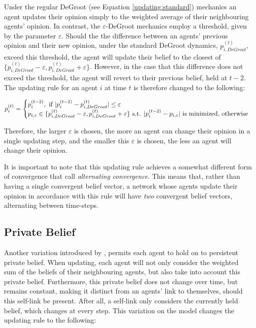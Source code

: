 \documentclass[a4paper, 12pt]{report}
\newcommand{\beli}[3][2]{p_{#2}^{(#3)}}
\begin{document}
\noindent Under the regular DeGroot (see Equation \ref{updating:standard}) mechanics an agent updates their opinion simply to the weighted average of their neighbouring agents' opinion. In contrast, the $\varepsilon$-DeGroot mechanics employ a threshold, given by the parameter $\varepsilon$. Should the the difference between an agents' previous opinion and their new opinion, under the standard DeGroot dynamics, $\beli{i, DeGroot}{t}$, exceed this threshold, the agent will update their belief to the closest of $\{\beli{i, DeGroot}{t} - \varepsilon, \beli{i, DeGroot}{t} + \varepsilon\}$. However, in the case that this difference does not exceed the threshold, the agent will revert to their previous belief, held at $t-2$. The updating rule for an agent $i$ at time $t$ is therefore changed to the following:

\begin{equation*}
    \label{edegroot:updating}
  \beli{i}{t} =\Bigg\{
  \begin{matrix*}[l]
      \beli{i}{t-2}, \text{ if } |\beli{i}{t-2} - \beli{i, DeGroot}{t}| \leq \varepsilon\\
      p_{i, \varepsilon} \in \{\beli{i, DeGroot}{t}-\varepsilon, \beli{i, DeGroot}{t}+\varepsilon\}\text{ s.t. }|\beli{i}{t-2} -p_{i, \varepsilon}|\text{ is minimized, otherwise}
  \end{matrix*} \\
\end{equation*}

\noindent Therefore, the larger $\varepsilon$ is chosen, the more an agent can change their opinion in a single updating step, and the smaller this $\varepsilon$ is chosen, the less an agent will change their opinion. 

\noindent It is important to note that this updating rule achieves a somewhat different form of convergence that \cite{amir2021robust} call \emph{alternating convergence}. This means that, rather than having a single convergent belief vector, a network whose agents update their opinion in accordance with this rule will have \emph{two} convergent belief vectors, alternating between time-steps.

\subsection{Private Belief}
\label{updating:private}
Another variation introduced by \cite{friedkin1990private}, permits each agent to hold on to persistent private belief. When updating, each agent will not only consider the weighted sum of the beliefs of their neighbouring agents, but also take into account this private belief. Furthermore, this private belief does not change over time, but remains constant, making it distinct from an agents' link to themselves, should this self-link be present. After all, a self-link only considers the currently held belief, which changes at every step. This variation on the model changes the updating rule to the following:
\end{document}
